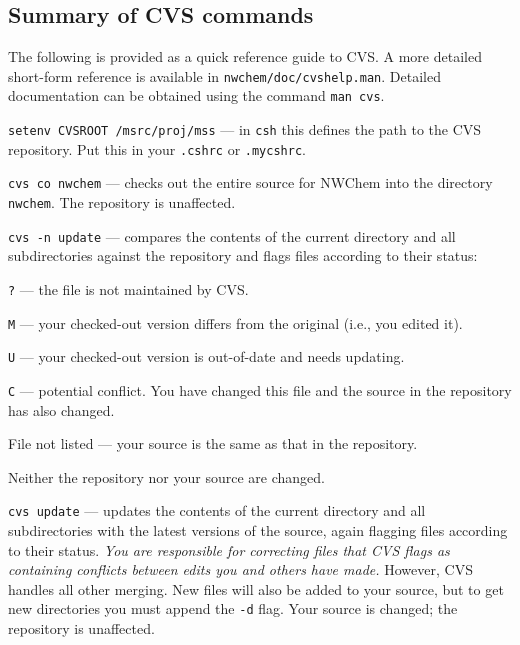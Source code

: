 \subsection{Summary of CVS commands}

The following is provided as a quick reference guide to CVS.  A more
detailed short-form reference is available in
\texttt{nwchem/doc/cvshelp.man}.  Detailed documentation can be obtained using 
the command
\texttt{man cvs}.

\begin{description}
\item{\texttt{setenv CVSROOT /msrc/proj/mss}} --- in \texttt{csh} this
  defines the path to the CVS repository.  Put this in your
  \texttt{.cshrc} or \texttt{.mycshrc}.
 
\item{\texttt{cvs co nwchem}} --- checks out the entire source for NWChem into
  the directory \texttt{nwchem}.  The repository is unaffected.
  
\item{\texttt{cvs -n update}} --- compares the contents of the current
  directory and all subdirectories against the repository and flags
  files according to their status:
  \begin{description}
  \item{\texttt{?}} --- the file is not maintained by CVS.
  \item{\texttt{M}} --- your checked-out version differs from the original
    (i.e., you edited it).
  \item{\texttt{U}} --- your checked-out version is out-of-date and
    needs updating.
  \item{\texttt{C}} --- potential conflict. You have changed this file
    and the source in the repository has also changed.
  \item{File not listed} --- your source is the same as that in the repository.
  \end{description}
  Neither the repository nor your source are changed.

\item{\texttt{cvs update}} --- updates the contents of the current
  directory and all subdirectories with the latest versions of the
  source, again flagging files according to their status. {\em You are
    responsible for correcting files that CVS flags as containing
    conflicts between edits you and others have made.} However, CVS
  handles all other merging.  New files will also be added to your
  source, but to get new directories you must append the
  \texttt{-d} flag.  Your source is changed; the repository is
  unaffected.


\end{description}
